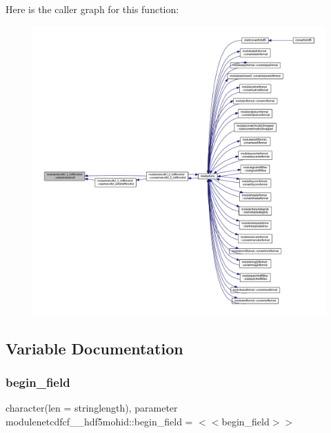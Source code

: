 Here is the caller graph for this function\+:\nopagebreak
\begin{figure}[H]
\begin{center}
\leavevmode
\includegraphics[width=350pt]{namespacemodulenetcdfcf__2__hdf5mohid_a4a79edecc3020a71ece2ef3223da1024_icgraph}
\end{center}
\end{figure}


\subsection{Variable Documentation}
\mbox{\label{namespacemodulenetcdfcf__2__hdf5mohid_aac283ad6dfec7b5769037bc1906cf217}} 
\subsubsection{\texorpdfstring{begin\+\_\+field}{begin\_field}}
{\footnotesize\ttfamily character(len = stringlength), parameter modulenetcdfcf\+\_\+\_\+hdf5mohid\+::begin\+\_\+field = \textquotesingle{}$<$$<$begin\+\_\+field$>$$>$\textquotesingle{}\hspace{0.3cm}{\ttfamily [private]}}

